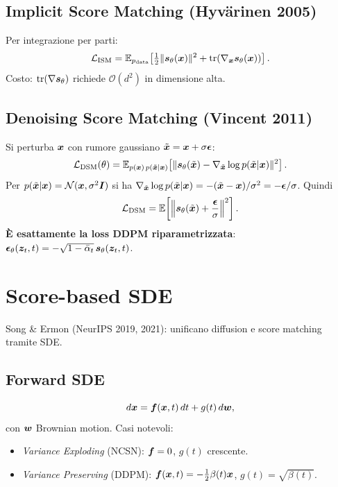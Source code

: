 \subsection{Implicit Score Matching (Hyvärinen 2005)}
Per integrazione per parti:
\[
\mathcal{L}_{\text{ISM}} = \mathbb{E}_{p_{\text{data}}}\!\left[ \tfrac{1}{2}\| \bm{s}_\theta(\bm{x})\|^2 + \mathrm{tr}\!\left(\nabla_{\bm{x}} \bm{s}_\theta(\bm{x})\right)\right].
\]
Costo: $\mathrm{tr}(\nabla \bm{s}_\theta)$ richiede $\mathcal{O}(d^2)$ in dimensione alta.

\subsection{Denoising Score Matching (Vincent 2011)}
Si perturba $\bm{x}$ con rumore gaussiano $\tilde{\bm{x}} = \bm{x} + \sigma \boldsymbol{\epsilon}$:
\[
\mathcal{L}_{\text{DSM}}(\theta) = \mathbb{E}_{p(\bm{x})\,p(\tilde{\bm{x}}|\bm{x})}\!\left[\| \bm{s}_\theta(\tilde{\bm{x}}) - \nabla_{\tilde{\bm{x}}}\log p(\tilde{\bm{x}}|\bm{x})\|^2\right].
\]
Per $p(\tilde{\bm{x}}|\bm{x}) = \mathcal{N}(\bm{x}, \sigma^2 \bm{I})$ si ha $\nabla_{\tilde{\bm{x}}} \log p(\tilde{\bm{x}}|\bm{x}) = -(\tilde{\bm{x}}-\bm{x})/\sigma^2 = -\boldsymbol{\epsilon}/\sigma$. Quindi
\[
\mathcal{L}_{\text{DSM}} = \mathbb{E}\!\left[\left\| \bm{s}_\theta(\tilde{\bm{x}}) + \frac{\boldsymbol{\epsilon}}{\sigma}\right\|^2\right].
\]
\textbf{È esattamente la loss DDPM riparametrizzata}: $\boldsymbol{\epsilon}_\theta(\bm{z}_t, t) = -\sqrt{1-\bar\alpha_t}\,\bm{s}_\theta(\bm{z}_t, t)$.

\section{Score-based SDE}

Song \& Ermon (NeurIPS 2019, 2021): unificano diffusion e score matching tramite SDE.
\subsection{Forward SDE}
\[
d\bm{x} = \bm{f}(\bm{x}, t)\, dt + g(t)\, d\bm{w},
\]
con $\bm{w}$ Brownian motion. Casi notevoli:
\begin{itemize}
  \item \emph{Variance Exploding} (NCSN): $\bm{f} = 0$, $g(t)$ crescente.
  \item \emph{Variance Preserving} (DDPM): $\bm{f}(\bm{x},t) = -\tfrac{1}{2}\beta(t)\bm{x}$, $g(t) = \sqrt{\beta(t)}$.
\end{itemize}

